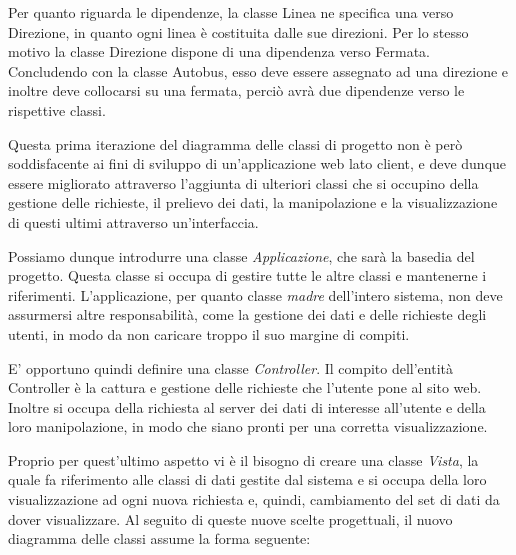Per quanto riguarda le dipendenze, la classe Linea ne specifica una verso Direzione, in quanto ogni linea è costituita dalle sue direzioni. Per lo stesso motivo la classe Direzione dispone di una dipendenza verso Fermata. Concludendo con la classe Autobus, esso deve essere assegnato ad una direzione e inoltre deve collocarsi su una fermata, perciò avrà due dipendenze verso le rispettive classi.

Questa prima iterazione del diagramma delle classi di progetto non è però soddisfacente ai fini di sviluppo di un'applicazione web lato client, e deve dunque essere migliorato attraverso l'aggiunta di ulteriori classi che si occupino della gestione delle richieste, il prelievo dei dati, la manipolazione e la visualizzazione di questi ultimi attraverso un'interfaccia.

Possiamo dunque introdurre una classe {\itshape Applicazione}, che sarà la basedia del progetto. Questa classe si occupa di gestire tutte le altre classi e mantenerne i riferimenti.
L'applicazione, per quanto classe {\itshape madre} dell'intero sistema, non deve assurmersi altre responsabilità, come la gestione dei dati e delle richieste degli utenti, in modo da non caricare troppo il suo margine di compiti.

E' opportuno quindi definire una classe {\itshape Controller}. Il compito dell'entità Controller è la cattura e gestione delle richieste che l'utente pone al sito web. Inoltre si occupa della richiesta al server dei dati di interesse all'utente e della loro manipolazione, in modo che siano pronti per una corretta visualizzazione.

Proprio per quest'ultimo aspetto vi è il bisogno di creare una classe {\itshape Vista}, la quale fa riferimento alle classi di dati gestite dal sistema e si occupa della loro visualizzazione ad ogni nuova richiesta e, quindi, cambiamento del set di dati da dover visualizzare.
\newpage
Al seguito di queste nuove scelte progettuali, il nuovo diagramma delle classi assume la forma seguente:

